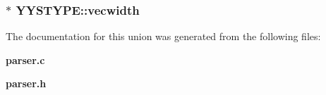 \subsubsection{$\ast$ {\bf YYSTYPE::vecwidth}}\label{unionYYSTYPE_o8}




The documentation for this union was generated from the following files:\begin{CompactItemize}
\item 
{\bf parser.c}\item 
{\bf parser.h}\end{CompactItemize}
